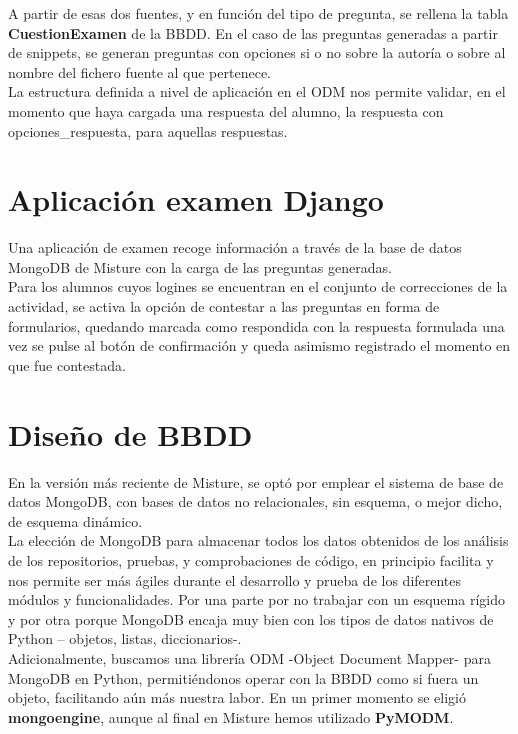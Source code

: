 A partir de esas dos fuentes, y en función del tipo de pregunta, se rellena la tabla \textbf{CuestionExamen} de la BBDD. En el caso de las preguntas generadas a partir de snippets, se generan preguntas con opciones si o no sobre la autoría o sobre al nombre del fichero fuente al que pertenece.\\


La estructura definida a nivel de aplicación en el ODM nos permite validar, en el momento que haya cargada una respuesta del alumno, la respuesta con opciones\_respuesta, para aquellas respuestas.\\


\section{Aplicación examen Django}

Una aplicación de examen recoge información a través de la base de datos MongoDB de Misture con la carga de las preguntas generadas.\\


Para los alumnos cuyos logines se encuentran en el conjunto de correcciones de la actividad, se activa la opción de contestar a las preguntas en forma de formularios, quedando marcada como respondida con la respuesta formulada una vez se pulse al botón de confirmación y queda asimismo registrado el momento en que fue contestada.


\section{Diseño de BBDD} 
\label{sec:bbdd}
En la versión más reciente de Misture, se optó por emplear el sistema de base de datos MongoDB, con bases de datos no relacionales, sin esquema, o mejor dicho, de esquema dinámico.\\


La elección de MongoDB para almacenar todos los datos obtenidos de los análisis de los repositorios, pruebas, y comprobaciones de código, en principio facilita y nos permite ser más ágiles durante el desarrollo y prueba de los diferentes módulos y funcionalidades. Por una parte por no trabajar con un esquema rígido y por otra porque MongoDB encaja muy bien con los tipos de datos nativos de Python – objetos, listas, diccionarios-.\\


Adicionalmente, buscamos una librería ODM -Object Document Mapper- para MongoDB en Python, permitiéndonos operar con la BBDD como si fuera un objeto, facilitando aún más nuestra labor. En un primer momento se eligió \textbf{mongoengine}, aunque al final en Misture hemos utilizado \textbf{PyMODM}.\\


